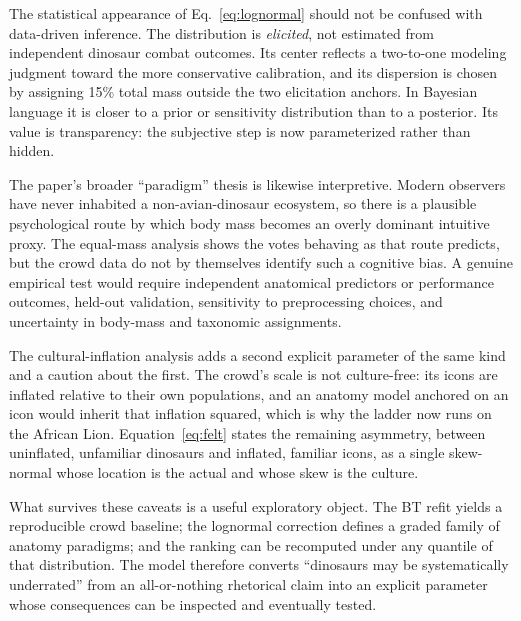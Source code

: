 \documentclass[11pt]{article}
\begin{document}
The statistical appearance of Eq.~\eqref{eq:lognormal} should not be confused with data-driven inference. The distribution is \emph{elicited}, not estimated from independent dinosaur combat outcomes. Its center reflects a two-to-one modeling judgment toward the more conservative calibration, and its dispersion is chosen by assigning 15\% total mass outside the two elicitation anchors. In Bayesian language it is closer to a prior or sensitivity distribution than to a posterior. Its value is transparency: the subjective step is now parameterized rather than hidden.

The paper's broader ``paradigm'' thesis is likewise interpretive. Modern observers have never inhabited a non-avian-dinosaur ecosystem, so there is a plausible psychological route by which body mass becomes an overly dominant intuitive proxy. The equal-mass analysis shows the votes behaving as that route predicts, but the crowd data do not by themselves identify such a cognitive bias. A genuine empirical test would require independent anatomical predictors or performance outcomes, held-out validation, sensitivity to preprocessing choices, and uncertainty in body-mass and taxonomic assignments.

The cultural-inflation analysis adds a second explicit parameter of the same kind and a caution about the first. The crowd's scale is not culture-free: its icons are inflated relative to their own populations, and an anatomy model anchored on an icon would inherit that inflation squared, which is why the ladder now runs on the African Lion. Equation~\eqref{eq:felt} states the remaining asymmetry, between uninflated, unfamiliar dinosaurs and inflated, familiar icons, as a single skew-normal whose location is the actual and whose skew is the culture.

What survives these caveats is a useful exploratory object. The BT refit yields a reproducible crowd baseline; the lognormal correction defines a graded family of anatomy paradigms; and the ranking can be recomputed under any quantile of that distribution. The model therefore converts ``dinosaurs may be systematically underrated'' from an all-or-nothing rhetorical claim into an explicit parameter whose consequences can be inspected and eventually tested.
\end{document}
